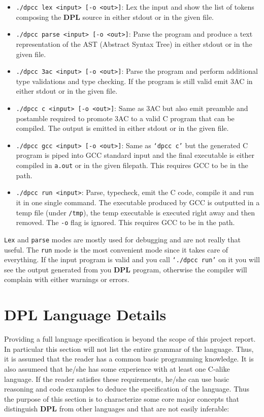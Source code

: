 \documentclass[a4paper]{article}
\begin{document}
\begin{itemize}
    \item \texttt{./dpcc lex <input> [-o <out>]}: Lex the input and show the list of tokens composing the \textbf{DPL} source in either stdout or in the given file.
    \item \texttt{./dpcc parse <input> [-o <out>]}: Parse the program and produce a text representation of the AST (Abstract Syntax Tree) in either stdout or in the given file.
    \item \texttt{./dpcc 3ac <input> [-o <out>]}: Parse the program and perform additional type validations and type checking. If the program is still valid emit 3AC in either stdout or in the given file.
    \item \texttt{./dpcc c <input> [-o <out>]}: Same as 3AC but also emit preamble and postamble required  to promote 3AC to a  valid C program that can be compiled. The output is emitted in either stdout or in the given file.
    \item \texttt{./dpcc gcc <input> [-o <out>]}: Same as \texttt{`dpcc c'} but the generated C program is piped into GCC standard input and the final executable is either compiled in \texttt{a.out} or in the given filepath. This requires GCC to be in the path.
    \item \texttt{./dpcc run <input>}: Parse, typecheck, emit the C code, compile it and run it in one single command. The executable produced by GCC is outputted in a temp file (under \texttt{/tmp}), the temp executable is executed right away and then removed. The \texttt{-o} flag is ignored. This requires GCC to be in the path.
\end{itemize}

\texttt{Lex} and \texttt{parse} modes are mostly used for debugging and are not really that useful.
The \texttt{run} mode
is the most convenient mode since it takes care of everything. If the input program is valid and
you call \texttt{`./dpcc run'} on it you will see the output generated from you \textbf{DPL} program,
otherwise the compiler will complain with either warnings or errors.

\clearpage

\section{DPL Language Details}

Providing a full language specification is beyond the scope of this project report. In particular
this section will not list the entire grammar of the language. Thus, it is assumed
that the reader has a common basic programming knowledge. It is also assumeed that he/she has some experience
with at least one C-alike language. If the reader satisfies these requirements, he/she can use
basic reasoning and code examples to deduce the specification of the language. Thus the purpose
of this section is to characterize some core major concepts that distinguish
\textbf{DPL} from other languages and that are not easily inferable:
\end{document}
